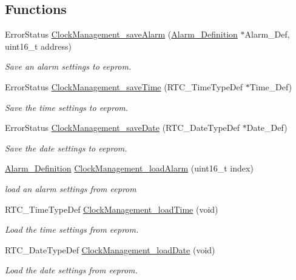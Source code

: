\subsection*{Functions}
\begin{DoxyCompactItemize}
\item 
Error\+Status \hyperlink{group___clock___management___eeprom_ga98aa8b6a9e96cd5fd883602c23bf1c4a}{Clock\+Management\+\_\+save\+Alarm} (\hyperlink{group__type_d4/d90/struct_alarm___definition}{Alarm\+\_\+\+Definition} $\ast$Alarm\+\_\+\+Def, uint16\+\_\+t address)
\begin{DoxyCompactList}\small\item\em Save an alarm settings to eeprom. \end{DoxyCompactList}\item 
Error\+Status \hyperlink{group___clock___management___eeprom_ga4d1c66f7ce4d69b6903471823ab105f7}{Clock\+Management\+\_\+save\+Time} (R\+T\+C\+\_\+\+Time\+Type\+Def $\ast$Time\+\_\+\+Def)
\begin{DoxyCompactList}\small\item\em Save the time settings to eeprom. \end{DoxyCompactList}\item 
Error\+Status \hyperlink{group___clock___management___eeprom_ga32f8e9df4e2b14dfa0db0300437fe335}{Clock\+Management\+\_\+save\+Date} (R\+T\+C\+\_\+\+Date\+Type\+Def $\ast$Date\+\_\+\+Def)
\begin{DoxyCompactList}\small\item\em Save the date settings to eeprom. \end{DoxyCompactList}\item 
\hyperlink{group__type_d4/d90/struct_alarm___definition}{Alarm\+\_\+\+Definition} \hyperlink{group___clock___management___eeprom_gab8401f24d519d3a2e54c3ba5dab80376}{Clock\+Management\+\_\+load\+Alarm} (uint16\+\_\+t index)
\begin{DoxyCompactList}\small\item\em load an alarm settings from eeprom \end{DoxyCompactList}\item 
R\+T\+C\+\_\+\+Time\+Type\+Def \hyperlink{group___clock___management___eeprom_ga166e0bbb5e934cc45657ffad06ff1d62}{Clock\+Management\+\_\+load\+Time} (void)
\begin{DoxyCompactList}\small\item\em Load the time settings from eeprom. \end{DoxyCompactList}\item 
R\+T\+C\+\_\+\+Date\+Type\+Def \hyperlink{group___clock___management___eeprom_ga3980560a99803ef94287127ff3157f91}{Clock\+Management\+\_\+load\+Date} (void)
\begin{DoxyCompactList}\small\item\em Load the date settings from eeprom. \end{DoxyCompactList}\end{DoxyCompactItemize}


